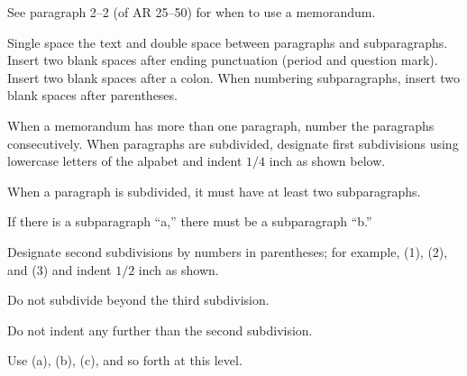 \documentclass{armymemo}
\begin{document}
\AMsethead{}

\Ni{} See paragraph 2--2 (of AR 25--50) for when to use a memorandum.

\Ni{} Single space the text and double space between paragraphs and
subparagraphs. Insert two blank spaces after ending punctuation (period and
question mark). %
Insert two blank spaces after a colon. When numbering subparagraphs, insert two
blank spaces after parentheses.

\Ni{} When a memorandum has more than one paragraph, number the paragraphs
consecutively. When paragraphs are subdivided, designate first subdivisions
using lowercase letters of the alpabet and indent $1/4$ inch as shown below.

\Nii{} When a paragraph is subdivided, it must have at least two subparagraphs.

\Nii{} If there is a subparagraph ``a,'' there must be a subparagraph ``b.''

\Niii{} Designate second subdivisions by numbers in parentheses; for example, (1),
(2), and (3) and indent $1/2$ inch as shown.

\Niii{} Do not subdivide beyond the third subdivision.

\Niiii{} Do not indent any further than the second subdivision.

\Niiii{} Use (a), (b), (c), and so forth at this level.

\end{document}
